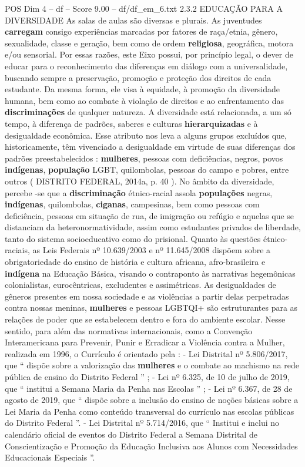 \begin{textsample}{POS Dim 4 – df – Score 9.00 – df/df\_em\_6.txt}  \label{ex:f4_pos_225}
2.3.2 EDUCAÇÃO PARA A DIVERSIDADE As salas de aulas são diversas e plurais.
As juventudes \textbf{carregam} consigo experiências marcadas por fatores de raça/etnia, gênero, sexualidade, classe e geração, bem como de ordem \textbf{religiosa}, geográfica, motora e/ou sensorial.
Por essas razões, este Eixo possui, por princípio legal, o dever de educar para o reconhecimento das diferenças em diálogo com a universalidade, buscando sempre a preservação, promoção e proteção dos direitos de cada estudante.
Da mesma forma, ele visa à equidade, à promoção da diversidade humana, bem como ao combate à violação de direitos e ao enfrentamento das \textbf{discriminações} de qualquer natureza.
A diversidade está relacionada, a um só tempo, à diferença de padrões, saberes e culturas \textbf{hierarquizadas} e à desigualdade econômica.
Esse atributo nos leva a alguns grupos excluídos que, historicamente, têm vivenciado a desigualdade em virtude de suas diferenças dos padrões preestabelecidos : \textbf{mulheres}, pessoas com deficiências, negros, povos \textbf{indígenas}, \textbf{população} LGBT, quilombolas, pessoas do campo e pobres, entre outros ( DISTRITO FEDERAL, 2014a, p. 40 ).
No âmbito da diversidade, percebe -se que a \textbf{discriminação} étnico-racial assola \textbf{populações} negras, \textbf{indígenas}, quilombolas, \textbf{ciganas}, campesinas, bem como pessoas com deficiência, pessoas em situação de rua, de imigração ou refúgio e aquelas que se distanciam da heteronormatividade, assim como estudantes privados de liberdade, tanto do sistema socioeducativo como do prisional.
Quanto às questões étnico-raciais, as Leis Federais nº 10.639/2003 e nº 11.645/2008 dispõem sobre a obrigatoriedade do ensino de história e cultura africana, afro-brasileira e \textbf{indígena} na Educação Básica, visando o contraponto às narrativas hegemônicas colonialistas, eurocêntricas, excludentes e assimétricas.
As desigualdades de gêneros presentes em nossa sociedade e as violências a partir delas perpetradas contra nossas meninas, \textbf{mulheres} e pessoas LGBTQI+ são estruturantes para as relações de poder que se estabelecem dentro e fora do ambiente escolar.
Nesse sentido, para além das normativas internacionais, como a Convenção Interamericana para Prevenir, Punir e Erradicar a Violência contra a Mulher, realizada em 1996, o Currículo é orientado pela : - Lei Distrital nº 5.806/2017, que “ dispõe sobre a valorização das \textbf{mulheres} e o combate ao machismo na rede pública de ensino do Distrito Federal ” ; - Lei nº 6.325, de 10 de julho de 2019, que “ institui a Semana Maria da Penha nas Escolas ” ; - Lei nº 6.367, de 28 de agosto de 2019, que “ dispõe sobre a inclusão do ensino de noções básicas sobre a Lei Maria da Penha como conteúdo transversal do currículo nas escolas públicas do Distrito Federal ”. - Lei Distrital nº 5.714/2016, que “ Institui e inclui no calendário oficial de eventos do Distrito Federal a Semana Distrital de Conscientização e Promoção da Educação Inclusiva aos Alunos com Necessidades Educacionais Especiais ”.

\end{textsample}
